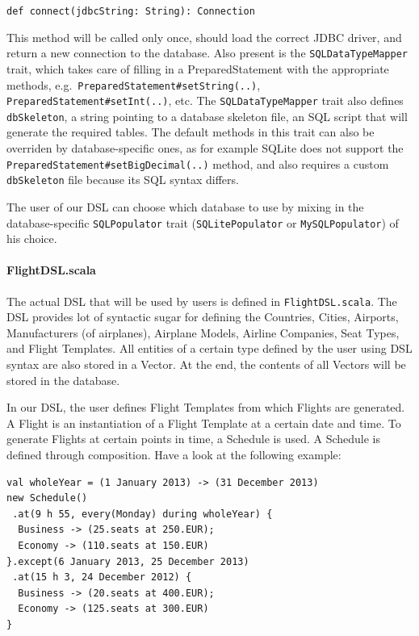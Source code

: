 \documentclass[a4paper]{article}
\newcommand{\cc}[1]{\texttt{#1}}
\renewcommand{\sc}[1]{\lstinline{#1}}
\begin{document}
\sc{def connect(jdbcString: String): Connection}

This method will be called only once, should load the correct JDBC driver, and return a new connection to the database.
Also present is the \cc{SQLDataTypeMapper} trait, which takes care of filling in a PreparedStatement with the appropriate methods, e.g.\ \cc{Prepared\-State\-ment\-\#set\-String(..)}, \cc{Prepared\-State\-ment\-\#set\-Int(..)}, etc.
The \cc{SQLDataTypeMapper} trait also defines \sc{dbSkeleton}, a string pointing to a database skeleton file, an SQL script that will generate the required tables.
The default methods in this trait can also be overriden by database-specific ones, as for example SQLite does not support the \cc{Prepared\-State\-ment\-\#set\-Big\-Decimal(..)} method, and also requires a custom \sc{dbSkeleton} file because its SQL syntax differs.

The user of our DSL can choose which database to use by mixing in the database-specific \cc{SQL\-Populator} trait (\cc{SQLitePopulator} or \cc{MySQL\-Populator}) of his choice.

\paragraph{FlightDSL.scala}
The actual DSL that will be used by users is defined in \cc{Flight\-DSL.scala}.
The DSL provides lot of syntactic sugar for defining the Countries, Cities, Airports, Manufacturers (of airplanes), Airplane Models, Airline Companies, Seat Types, and Flight Templates.
All entities of a certain type defined by the user using DSL syntax are also stored in a Vector.
At the end, the contents of all Vectors will be stored in the database.

In our DSL, the user defines Flight Templates from which Flights are generated.
A Flight is an instantiation of a Flight Template at a certain date and time.
To generate Flights at certain points in time, a Schedule is used.
A Schedule is defined through composition.
Have a look at the following example:
\begin{lstlisting}
val wholeYear = (1 January 2013) -> (31 December 2013)
new Schedule()
 .at(9 h 55, every(Monday) during wholeYear) {
  Business -> (25.seats at 250.EUR);
  Economy -> (110.seats at 150.EUR)
}.except(6 January 2013, 25 December 2013)
 .at(15 h 3, 24 December 2012) {
  Business -> (20.seats at 400.EUR);
  Economy -> (125.seats at 300.EUR)
}
\end{lstlisting}
\end{document}
